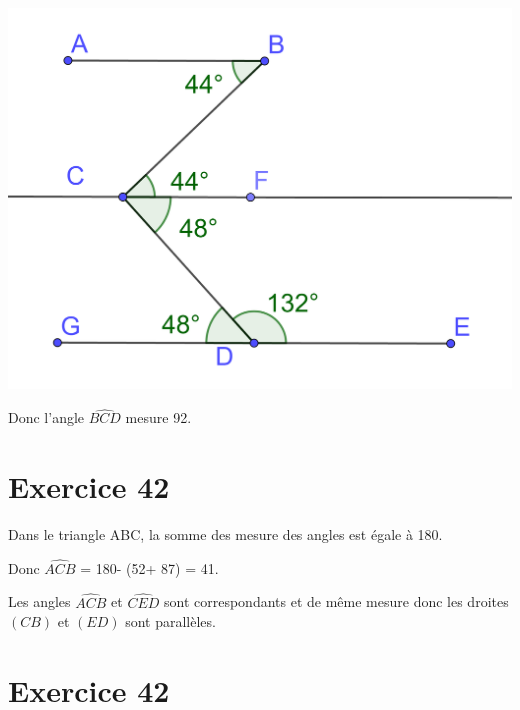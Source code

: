 \documentclass[12pt,a4paper]{article}
\begin{document}
\begin{center}
	\includegraphics[scale=0.1]{ex37_5}
\end{center}

Donc l'angle $\widehat{BCD}$ mesure 92\degree .


\section*{Exercice 42}

Dans le triangle ABC, la somme des mesure des angles est égale à 180\degree . 

Donc $\widehat{ACB}$ = 180\degree - (52\degree  + 87\degree ) = 41\degree .


Les angles $\widehat{ACB}$ et $\widehat{CED}$ sont correspondants et de même mesure donc les droites $(CB)$ et $(ED)$ sont parallèles.


\section*{Exercice 42}
\end{document}
